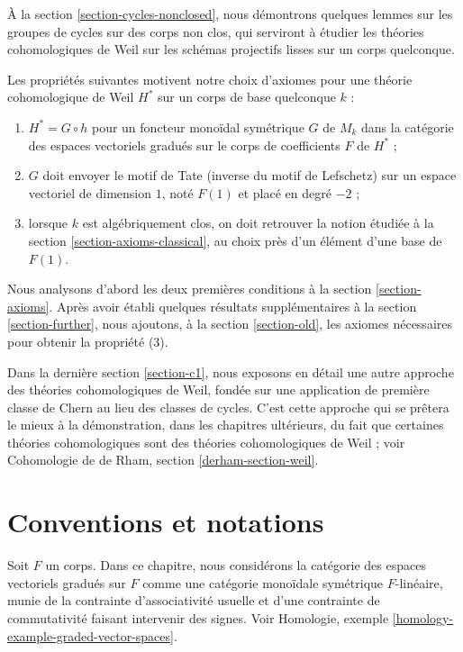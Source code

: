 \medskip\noindent
À la section \ref{section-cycles-nonclosed}, nous démontrons quelques lemmes
sur les groupes de cycles sur des corps non clos, qui serviront à étudier
les théories cohomologiques de Weil sur les schémas projectifs lisses
sur un corps quelconque.

\medskip\noindent
Les propriétés suivantes motivent notre choix d'axiomes pour une théorie
cohomologique de Weil $H^*$ sur un corps de base quelconque $k$ :
\begin{enumerate}
\item $H^* = G \circ h$ pour un foncteur monoïdal symétrique $G$ de $M_k$
dans la catégorie des espaces vectoriels gradués sur le corps de coefficients $F$ de $H^*$ ;
\item $G$ doit envoyer le motif de Tate (inverse du motif de Lefschetz)
sur un espace vectoriel de dimension $1$, noté $F(1)$ et placé en degré $-2$ ;
\item lorsque $k$ est algébriquement clos, on doit retrouver la notion
étudiée à la section \ref{section-axioms-classical},
au choix près d'un élément d'une base de $F(1)$.
\end{enumerate}
Nous analysons d'abord les deux premières conditions à la section \ref{section-axioms}.
Après avoir établi quelques résultats supplémentaires à la section \ref{section-further},
nous ajoutons, à la section \ref{section-old}, les axiomes nécessaires
pour obtenir la propriété (3).

\medskip\noindent
Dans la dernière section \ref{section-c1}, nous exposons en détail
une autre approche des théories cohomologiques de Weil, fondée sur
une application de première classe de Chern au lieu des classes de cycles.
C'est cette approche qui se prêtera le mieux à la démonstration, dans
les chapitres ultérieurs, du fait que certaines théories cohomologiques
sont des théories cohomologiques de Weil ; voir
Cohomologie de de Rham, section \ref{derham-section-weil}.





\section{Conventions et notations}
\label{section-conventions}

\noindent
Soit $F$ un corps. Dans ce chapitre, nous considérons la catégorie des espaces
vectoriels gradués sur $F$ comme une catégorie monoïdale symétrique $F$-linéaire,
munie de la contrainte d'associativité usuelle et d'une contrainte de commutativité
faisant intervenir des signes.
Voir Homologie, exemple \ref{homology-example-graded-vector-spaces}.

